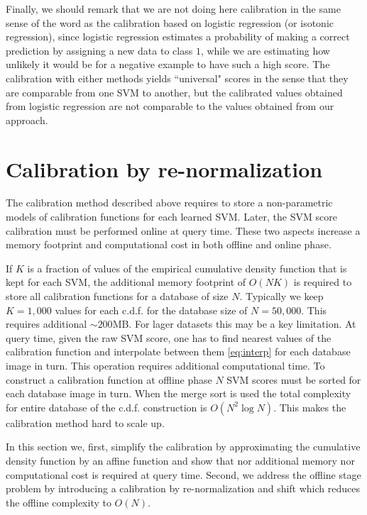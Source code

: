       Finally, we should remark that we are not doing here calibration in the same sense of the word as the calibration based on logistic regression (or isotonic regression), since logistic regression estimates a probability of making a correct prediction by assigning a new data to class $1$, while we are estimating how unlikely it would be for a negative example to have such a high score. The calibration with either methods yields ``universal" scores in the sense that they are comparable from one SVM to another, but the calibrated values obtained from logistic regression are not comparable to the values obtained from our approach.

\section{Calibration by re-normalization}
\label{sec:calibrationRenorm}
  The calibration method described above requires to store a non-parametric models of calibration functions for each learned SVM. Later, the SVM score calibration must be performed online at query time. These two aspects increase a memory footprint and computational cost in both offline and online phase. 

  If $K$ is a fraction of values of the empirical cumulative density function that is kept for each SVM, the additional memory footprint of $O(NK)$ is required to store all calibration functions for a database of size $N$. Typically we keep $K=1,000$ values for each c.d.f. for the database size of $N=50,000$. This requires additional $\sim 200$MB. For lager datasets this may be a key limitation. At query time, given the raw SVM score, one has to find nearest values of the calibration function and interpolate between them \eqref{eq:interp} for each database image in turn. This operation requires additional computational time.
  To construct a calibration function at offline phase $N$ SVM scores must be sorted for each database image in turn. When the merge sort is used the total complexity for entire database of the c.d.f. construction is $O(N^2 \log{N})$. This makes the calibration method hard to scale up.

  In this section we, first, simplify the calibration by approximating the cumulative density function by an affine function and show that nor additional memory nor computational cost is required at query time. Second, we address the offline stage problem by introducing a calibration by re-normalization and shift which reduces the offline complexity to $O(N)$.

